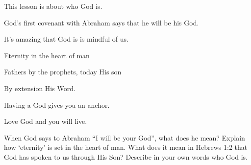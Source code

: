 \begin{discussion}

This lesson is about who God is.

 God's first covenant with Abraham says that he will be his God.


	 It's amazing that God is is mindful of us.


	 Eternity in the heart of man

   Fathers by the prophets, today His son
	
	By extension His Word.


	 Having a God gives you an anchor. 
	
	 Love God and you will live.

\end{discussion}

\begin{questions}
\q When God says to Abraham ``I will be your God'', what does he mean?
\q Explain how `eternity' is set in the heart of man.
\q What does it mean in Hebrews 1:2 that God has spoken to us through His Son?
\q Describe in your own words who God is.
\end{questions}